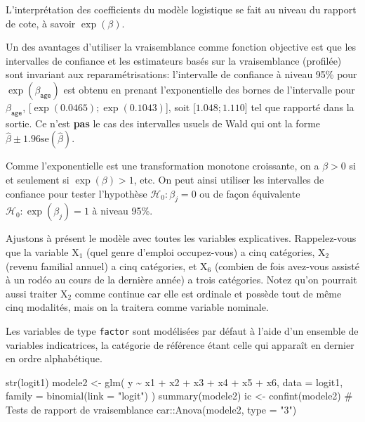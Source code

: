 \documentclass[
  11pt,
  letterpaper,
]{scrbook}
\newenvironment{Shaded}{\begin{snugshade}}{\end{snugshade}}
\newcommand{\AttributeTok}[1]{\textcolor[rgb]{0.40,0.45,0.13}{#1}}
\newcommand{\CommentTok}[1]{\textcolor[rgb]{0.37,0.37,0.37}{#1}}
\newcommand{\FunctionTok}[1]{\textcolor[rgb]{0.28,0.35,0.67}{#1}}
\newcommand{\NormalTok}[1]{\textcolor[rgb]{0.00,0.23,0.31}{#1}}
\newcommand{\OtherTok}[1]{\textcolor[rgb]{0.00,0.23,0.31}{#1}}
\newcommand{\SpecialCharTok}[1]{\textcolor[rgb]{0.37,0.37,0.37}{#1}}
\newcommand{\StringTok}[1]{\textcolor[rgb]{0.13,0.47,0.30}{#1}}
\theoremstyle{definition}
\theoremstyle{remark}
\begin{document}
L'interprétation des coefficients du modèle logistique se fait au niveau
du rapport de cote, à savoir \(\exp(\beta)\).

Un des avantages d'utiliser la vraisemblance comme fonction objective
est que les intervalles de confiance et les estimateurs basés sur la
vraisemblance (profilée) sont invariant aux reparamétrisations:
l'intervalle de confiance à niveau 95\% pour
\(\exp(\beta_{\texttt{age}})\) est obtenu en prenant l'exponentielle des
bornes de l'intervalle pour \(\beta_{\texttt{age}}\),
{[}\(\exp(0.0465); \exp(0.1043)\){]}, soit {[}\(1.048; 1.110\){]} tel
que rapporté dans la sortie. Ce n'est \textbf{pas} le cas des
intervalles usuels de Wald qui ont la forme
\(\widehat{\beta} \pm 1.96 \mathrm{se}(\widehat{\beta})\).

Comme l'exponentielle est une transformation monotone croissante, on a
\(\beta>0\) si et seulement si \(\exp(\beta)>1\), etc. On peut ainsi
utiliser les intervalles de confiance pour tester l'hypothèse
\(\mathscr{H}_0: \beta_j=0\) ou de façon équivalente
\(\mathscr{H}_0: \exp(\beta_j)=1\) à niveau 95\%.

Ajustons à présent le modèle avec toutes les variables explicatives.
Rappelez-vous que la variable \(\mathrm{X}_1\) (quel genre d'emploi
occupez-vous) a cinq catégories, \(\mathrm{X}_2\) (revenu familial
annuel) a cinq catégories, et \(\mathrm{X}_6\) (combien de fois
avez-vous assisté à un rodéo au cours de la dernière année) a trois
catégories. Notez qu'on pourrait aussi traiter \(\mathrm{X}_2\) comme
continue car elle est ordinale et possède tout de même cinq modalités,
mais on la traitera comme variable nominale.

Les variables de type \texttt{factor} sont modélisées par défaut à
l'aide d'un ensemble de variables indicatrices, la catégorie de
référence étant celle qui apparaît en dernier en ordre alphabétique.

\begin{Shaded}
\begin{Highlighting}[]
\FunctionTok{str}\NormalTok{(logit1)}
\NormalTok{modele2 }\OtherTok{\textless{}{-}} \FunctionTok{glm}\NormalTok{(}
\NormalTok{  y }\SpecialCharTok{\textasciitilde{}}\NormalTok{ x1 }\SpecialCharTok{+}\NormalTok{ x2 }\SpecialCharTok{+}\NormalTok{ x3 }\SpecialCharTok{+}\NormalTok{ x4 }\SpecialCharTok{+}\NormalTok{ x5 }\SpecialCharTok{+}\NormalTok{ x6,}
  \AttributeTok{data =}\NormalTok{ logit1,}
  \AttributeTok{family =} \FunctionTok{binomial}\NormalTok{(}\AttributeTok{link =} \StringTok{"logit"}\NormalTok{)}
\NormalTok{)}
\FunctionTok{summary}\NormalTok{(modele2)}
\NormalTok{ic }\OtherTok{\textless{}{-}} \FunctionTok{confint}\NormalTok{(modele2)}
\CommentTok{\# Tests de rapport de vraisemblance}
\NormalTok{car}\SpecialCharTok{::}\FunctionTok{Anova}\NormalTok{(modele2, }\AttributeTok{type =} \StringTok{"3"}\NormalTok{)}
\end{Highlighting}
\end{Shaded}
\end{document}
